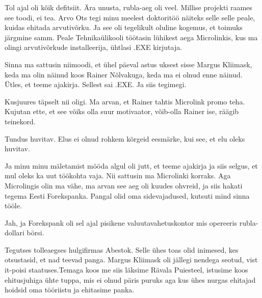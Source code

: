 
Tol ajal oli kõik defitsiit. Ära unusta, rubla-aeg oli veel. Millise projekti raames see toodi, ei tea. Arvo Ots tegi minu meelest doktoritöö näiteks selle selle peale, kuidas ehitada arvutivõrku. Ja see oli tegelikult  oluline kogemus,  et toimuks järgmine samm. Peale Tehnikaülikooli töötasin lühikest aega Microlinkis, kus ma olingi arvutivõrkude installeerija, ühtlasi .EXE kirjutaja.


Sinna ma sattusin niimoodi, et ühel päeval astus uksest sisse Margus Kliimask, keda ma olin näinud koos Rainer Nõlvakuga, keda ma ei olnud enne näinud. Ütles, et teeme ajakirja. Sellest sai .EXE. Ja siis tegimegi.


Kusjuures täpselt nii oligi. Ma arvan, et Rainer tahtis  Microlink promo teha. Kujutan ette, et see võiks olla  suur motivaator, võib-olla Rainer ise, räägib teinekord.


Tundus huvitav. Elus ei olnud rohkem  kõrgeid eesmärke, kui see,  et elu oleks huvitav.


Ja minu minu mäletamist mööda algul oli jutt, et teeme ajakirja ja siis selgus, et mul oleks ka uut töökohta vaja. Nii sattusin ma  Microlinki korraks. Aga Microlingis olin ma vähe, ma arvan see aeg oli kuudes ohvreid,  ja siis hakati tegema Eesti Forekspanka. Pangal olid oma sidevajadused, kutsuti mind sinna tööle.


Jah, ja Forekspank oli sel ajal pisikene valuutavahetuskontor mis opereeris rubla-dollari börsi.

Tegutses tolleaegses hulgifirmas Abestok. Selle  ühes toas olid inimesed, kes otsustasid, et nad teevad panga. Margus Kliimask oli jällegi nendega seotud, vist it-poisi staatuses.Temaga koos me siis läksime Rävala Puiesteel, istusime koos ehitusjuhiga ühte tuppa, mis ei olnud päris puruks aga kus ühes nurgas ehitajad hoidsid oma tööriistu ja ehitasime panka.

